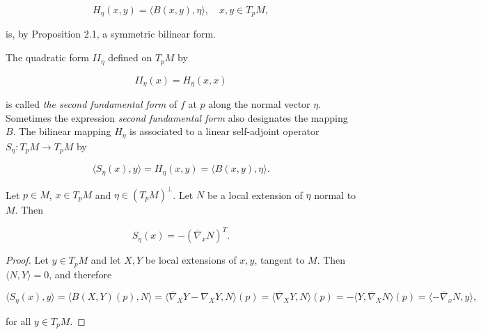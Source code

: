 $$
H_\eta(x,y)=\langle B(x,y),\eta\rangle,\quad x,y\in T_pM,
$$

is, by Proposition 2.1, a symmetric bilinear form.

\begin{definition}
  \label{def:dc-ch6-2-2}
  \leanok
  The quadratic form $\mathit{II}_\eta$ defined on $T_pM$ by
  
  $$
  \mathit{II}_\eta(x)=H_\eta(x,x)
  $$
  
  is called \emph{the second fundamental form} of $f$ at $p$ along the normal vector
  $\eta$. Sometimes the expression \emph{second fundamental form} also designates the
  mapping $B$. The bilinear mapping $H_\eta$ is associated to a linear self-adjoint
  operator $S_\eta:T_pM\to T_pM$ by
  
  $$
  \langle S_\eta(x),y\rangle=H_\eta(x,y)=\langle B(x,y),\eta\rangle.
  $$
\end{definition}

\begin{proposition}
  \label{prop:dc-ch6-2-3}
  \leanok
  Let $p\in M$, $x\in T_pM$ and $\eta\in(T_pM)^\perp$. Let $N$ be a local extension
  of $\eta$ normal to $M$. Then

  $$
  S_\eta(x)=-(\overline{\nabla}_x N)^T.
  $$
\end{proposition}
\begin{proof}
  \leanok
  \sketch
  Let $y\in T_pM$ and let $X,Y$ be local extensions of $x,y$, tangent to
  $M$. Then $\langle N,Y\rangle=0$, and therefore
  
  $$
  \langle S_\eta(x),y\rangle=\langle B(X,Y)(p),N\rangle=\langle\overline{\nabla}_X Y-\nabla_X Y,N\rangle(p)=\langle\overline{\nabla}_X Y,N\rangle(p)=-\langle Y,\overline{\nabla}_X N\rangle(p)=\langle-\overline{\nabla}_x N,y\rangle,
  $$
  
  for all $y\in T_pM$.
\end{proof}

